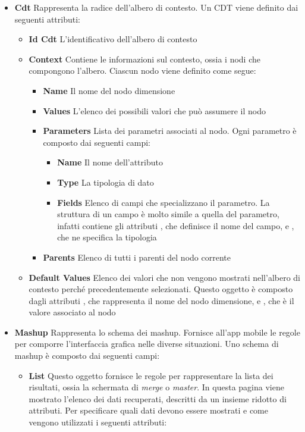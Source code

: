 \begin{itemize}
	\item \textbf{Cdt}
	Rappresenta la radice dell'albero di contesto. Un CDT viene definito dai seguenti attributi:
	\begin{itemize}
		\item \textbf{Id Cdt}
		L'identificativo dell'albero di contesto
		\item \textbf{Context}
		Contiene le informazioni sul contesto, ossia i nodi che compongono l'albero. Ciascun nodo viene definito come segue:
		\begin{itemize}
			\item \textbf{Name}
			Il nome del nodo dimensione
			\item \textbf{Values}
			L'elenco dei possibili valori che può assumere il nodo
			\item \textbf{Parameters}
			Lista dei parametri associati al nodo. Ogni parametro è composto dai seguenti campi:
			\begin{itemize}
				\item \textbf{Name}
				Il nome dell'attributo
				\item \textbf{Type}
				La tipologia di dato
				\item \textbf{Fields}
				Elenco di campi che specializzano il parametro. La struttura di un campo è molto simile a quella del parametro, infatti contiene gli attributi , che definisce il nome del campo, e , che ne specifica la tipologia
			\end{itemize}
			\item \textbf{Parents}
			Elenco di tutti i parenti del nodo corrente
		\end{itemize}
		\item \textbf{Default Values}
		Elenco dei valori che non vengono mostrati nell'albero di contesto perché precedentemente selezionati. Questo oggetto è composto dagli attributi , che rappresenta il nome del nodo dimensione, e , che è il valore associato al nodo
	\end{itemize}
	\item \textbf{Mashup}
	Rappresenta lo schema dei mashup. Fornisce all'app mobile le regole per comporre l'interfaccia grafica nelle diverse situazioni. Uno schema di mashup è composto dai seguenti campi:
	\begin{itemize}
		\item \textbf{List}
		Questo oggetto fornisce le regole per rappresentare la lista dei risultati, ossia la schermata di \emph{merge} o \emph{master}. In questa pagina viene mostrato l'elenco dei dati recuperati, descritti da un insieme ridotto di attributi. Per specificare quali dati devono essere mostrati e come vengono utilizzati i seguenti attributi:

\end{itemize}
\end{itemize}
